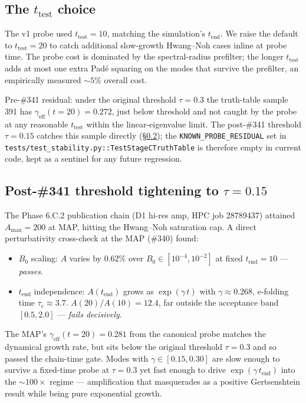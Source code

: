 \subsection{The $t_{\text{test}}$ choice}

The v1 probe used $t_{\text{test}} = 10$, matching the simulation's
$t_{\text{end}}$. We raise the default to $t_{\text{test}} = 20$ to
catch additional slow-growth Hwang--Noh cases inline at probe time.
The probe cost is dominated by the spectral-radius prefilter; the
longer $t_{\text{test}}$ adds at most one extra Pad\'e squaring on
the modes that survive the prefilter, an empirically measured ${\sim}5\%$
overall cost.

Pre-\#341 residual: under the original threshold $\tau = 0.3$
the truth-table sample 391 has $\gamma_{\text{eff}}(t = 20) = 0.272$,
just below threshold and not caught by the probe at any reasonable
$t_{\text{test}}$ within the linear-eigenvalue limit. The post-\#341
threshold $\tau = 0.15$ catches this sample directly
(\S\ref{sec:threshold-tightening}); the
\texttt{KNOWN\_PROBE\_RESIDUAL} set in
\texttt{tests/test\_stability.py::TestStageCTruthTable} is therefore
empty in current code, kept as a sentinel for any future regression.

\subsection{Post-\#341 threshold tightening to $\tau = 0.15$}
\label{sec:threshold-tightening}

The Phase 6.C.2 publication chain (D1 hi-res amp, HPC job 28789437)
attained $A_{\max} = 200$ at MAP, hitting the Hwang--Noh saturation
cap. A direct perturbativity cross-check at the MAP (\#340) found:
\begin{itemize}
\item $B_0$ scaling: $A$ varies by $0.62\%$ over $B_0 \in [10^{-4},
10^{-2}]$ at fixed $t_{\text{end}} = 10$ — \emph{passes}.
\item $t_{\text{end}}$ independence: $A(t_{\text{end}})$ grows as
$\exp(\gamma\, t)$ with $\gamma \approx 0.268$, e-folding time
$\tau_e \approx 3.7$. $A(20) / A(10) = 12.4$, far outside the
acceptance band $[0.5, 2.0]$ — \emph{fails decisively}.
\end{itemize}
The MAP's $\gamma_{\text{eff}}(t = 20) = 0.281$ from the canonical
probe matches the dynamical growth rate, but sits below the original
threshold $\tau = 0.3$ and so passed the chain-time gate. Modes with
$\gamma \in [0.15, 0.30]$ are slow enough to survive a fixed-time probe
at $\tau = 0.3$ yet fast enough to drive $\exp(\gamma\, t_{\text{end}})$
into the $\sim 100\times$ regime --- amplification that masquerades as
a positive Gertsenshtein result while being pure exponential growth.

